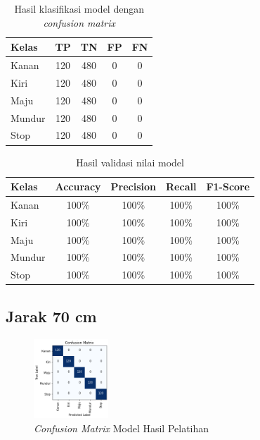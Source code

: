\begin{longtable}{|l|c|c|c|c|}
  \caption{Hasil klasifikasi model dengan \emph{confusion matrix}}
  \label{tb:cm_model3} \\
  \hline
  \rowcolor[HTML]{C0C0C0} 
  \textbf{Kelas} & \textbf{TP} & \textbf{TN} & \textbf{FP} & \textbf{FN} \\ \hline
  Kanan    & 120          & 480         & 0           & 0           \\ \hline
  Kiri      & 120          & 480         & 0           & 0           \\ \hline
  Maju      & 120          & 480         & 0           & 0           \\ \hline
  Mundur     & 120          & 480         & 0           & 0           \\ \hline
  Stop  & 120          & 480         & 0           & 0           \\ \hline
\end{longtable}

\begin{longtable}{|l|c|c|c|c|}
  \caption{Hasil validasi nilai model}
  \label{tb:vs_model3} \\
  \hline
  \rowcolor[HTML]{C0C0C0} 
  \textbf{Kelas} & \textbf{Accuracy} & \textbf{Precision} & \textbf{Recall} & \textbf{F1-Score} \\ \hline
  Kanan    & 100\%            & 100\%             & 100\%           & 100\%            \\ \hline
  Kiri     & 100\%          & 100\%           & 100\%           & 100\%           \\ \hline
  Maju      & 100\%          & 100\%           & 100\%          & 100\%          \\ \hline
  Mundur     & 100\%            & 100\%             & 100\%           & 100\%            \\ \hline
  Stop  & 100\%            & 100\%             & 100\%           & 100\%            \\ \hline
\end{longtable}

\subsection{Jarak 70 cm}

\begin{figure} [ht] \centering
  \includegraphics[width=0.25\textwidth]{gambar/bab4/model7 (70cm)/matrix.png}
  \caption{\emph{Confusion Matrix} Model Hasil Pelatihan}
  \label{fig:matrix4}
\end{figure}


